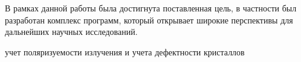 В рамках данной работы была достигнута поставленная цель,
в частности был разработан комплекс программ, который открывает
 широкие перспективы для дальнейших научных исследований.



учет поляризуемости излучения и учета дефектности кристаллов
